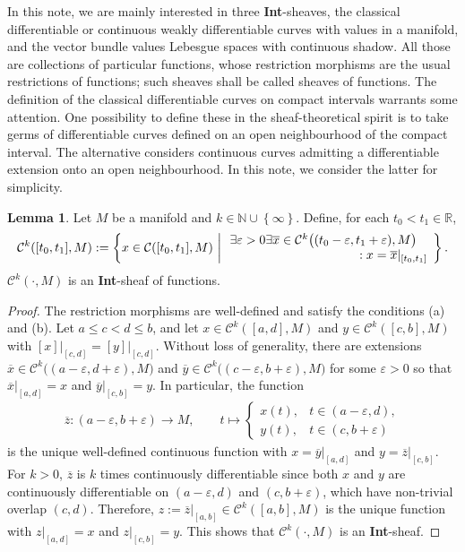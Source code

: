 \documentclass[preprint,12pt]{elsarticle}
\theoremstyle{definition}
\newtheorem{lemma}[theorem]{Lemma}
\newcommand{\set}[1]{\left\lbrace #1\right\rbrace}
\begin{document}
In this note, we are mainly interested in three \textbf{Int}-sheaves, the classical differentiable or continuous weakly differentiable curves with values in a manifold, and the vector bundle values Lebesgue spaces with continuous shadow. All those are collections of particular functions, whose restriction morphisms are the usual restrictions of functions; such sheaves shall be called sheaves of functions. The definition of the classical differentiable curves on compact intervals warrants some attention. One possibility to define these in the sheaf-theoretical spirit is to take germs of differentiable curves defined on an open neighbourhood of the compact interval. The alternative considers continuous curves admitting a differentiable extension onto an open neighbourhood. In this note, we consider the latter for simplicity.

\begin{lemma}
Let $M$ be a manifold and $k\in\mathbb{N}\cup\set{\infty}$. Define, for each $t_0<t_1\in\mathbb{R}$, 
\begin{align*}
\mathcal{C}^k([t_0,t_1],M) := \set{x\in\mathcal{C}([t_0,t_1],M)\,\left\vert\,\begin{array}{r}\exists \varepsilon>0\exists \overline{x}\in\mathcal{C}^k\big((t_0-\varepsilon,t_1+\varepsilon),M\big)\hspace*{3mm}\\: x = \overline{x}\vert_{[t_0,t_1]}
\end{array}\right.\!}.
\end{align*}
$\mathcal{C}^k(\cdot,M)$ is an \textbf{Int}-sheaf of functions.
\end{lemma}
\begin{proof}
The restriction morphisms are well-defined and satisfy the conditions (a) and (b). Let $a\leq c<d\leq b$, and let $x\in\mathcal{C}^k([a,d],M)$ and $y\in\mathcal{C}^k([c,b],M)$ with $[x]\vert_{[c,d]} = [y]\vert_{[c,d]}$. Without loss of generality, there are extensions $\overline{x}\in\mathcal{C}^k\big((a-\varepsilon,d+\varepsilon),M\big)$ and $\overline{y}\in\mathcal{C}^k\big((c-\varepsilon,b+\varepsilon),M\big)$ for some $\varepsilon>0$ so that $\overline{x}\vert_{[a,d]} = x$ and $\overline{y}\vert_{[c,b]} = y$. In particular, the function
\begin{align*}
\overline{z}: (a-\varepsilon,b+\varepsilon)\to M,\qquad t\mapsto\begin{cases}
x(t), & t\in (a-\varepsilon,d),\\
y(t), & t\in (c,b+\varepsilon)
\end{cases}
\end{align*}
is the unique well-defined continuous function with $x = \overline{y}\vert_{[a,d]}$ and $y = \overline{z}\vert_{[c,b]}$. For $k>0$, $\overline{z}$ is $k$ times continuously differentiable since both $x$ and $y$ are continuously differentiable on $(a-\varepsilon,d)$ and $(c,b+\varepsilon)$, which have non-trivial overlap $(c,d)$. Therefore, $z := \overline{z}\vert_{[a,b]}\in\mathcal{C}^k([a,b],M)$ is the unique function with $z\vert_{[a,d]} = x$ and $z\vert_{[c,b]} = y$. This shows that $\mathcal{C}^k(\cdot,M)$ is an \textbf{Int}-sheaf.
\end{proof}
\end{document}
